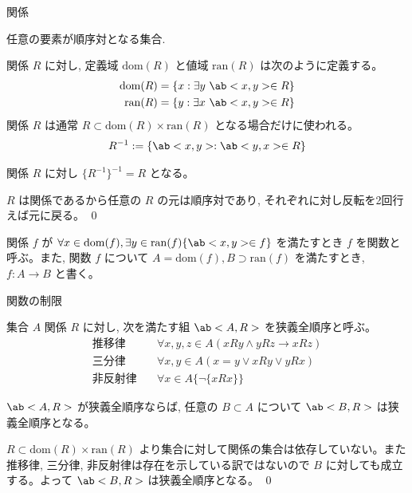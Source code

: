 \documentclass[uplatex,dvipdfmx,a4paper,11pt]{jlreq}
\makeatletter
\theoremstyle{definition}
\renewenvironment{proof}[1][\proofname]{\par
  \normalfont
  \topsep6\p@\@plus6\p@ \trivlist
  \item[\hskip\labelsep{\bfseries #1}\@addpunct{\bfseries}]\ignorespaces\quad\par
}{%
  \qed\endtrivlist\@endpefalse
}
\renewcommand\proofname{証明}
\makeatother
\begin{document}
\begin{definition}
  関係

  任意の要素が順序対となる集合.

  関係 $R$ に対し, 定義域 $\mathrm{dom}(R)$ と値域 $\mathrm{ran}(R)$ は次のように定義する。
  \begin{align}
    \mathrm{dom}(R) & = \{x:\exists y\ \ab<x,y>\in R\} \\
    \mathrm{ran}(R) & = \{y:\exists x\ \ab<x,y>\in R\}
  \end{align}
  関係 $R$ は通常 $R\subset \mathrm{dom}(R)\times\mathrm{ran}(R)$ となる場合だけに使われる。
  \begin{align}
    R^{-1} := \{\ab<x, y>:\ab<y, x>\in R\}
  \end{align}
\end{definition}

\begin{theorem}
  関係 $R$ に対し $\{R^{-1}\}^{-1} = R$ となる。
\end{theorem}
\begin{proof}
  $R$ は関係であるから任意の $R$ の元は順序対であり, それぞれに対し反転を2回行えば元に戻る。
\end{proof}

\begin{definition}[関数]
  関係 $f$ が $\forall x\in\mathrm{dom}(f),\exists y\in\mathrm{ran}(f)\{\ab<x,y>\in f\}$ を満たすとき $f$ を関数と呼ぶ。また, 関数 $f$ について $A=\mathrm{dom}(f), B\supset\mathrm{ran}(f)$ を満たすとき, $f:A\to B$ と書く。

  関数の制限
\end{definition}
\begin{definition}[狭義全順序]
  集合 $A$ 関係 $R$ に対し, 次を満たす組 $\ab<A, R>$ を狭義全順序と呼ぶ。
  \begin{align}
    \text{推移律}\quad  & \forall x,y,z\in A(xRy\land yRz\to xRz) \\
    \text{三分律}\quad  & \forall x, y\in A(x=y\lor xRy\lor yRx)  \\
    \text{非反射律}\quad & \forall x\in A\{\lnot\{xRx\}\}
  \end{align}
\end{definition}

\begin{theorem}
  $\ab<A, R>$ が狭義全順序ならば, 任意の $B\subset A$ について $\ab<B, R>$ は狭義全順序となる。
\end{theorem}
\begin{proof}
  $R\subset \mathrm{dom}(R)\times\mathrm{ran}(R)$ より集合に対して関係の集合は依存していない。また推移律, 三分律, 非反射律は存在を示している訳ではないので $B$ に対しても成立する。よって $\ab<B, R>$ は狭義全順序となる。
\end{proof}
\end{document}
